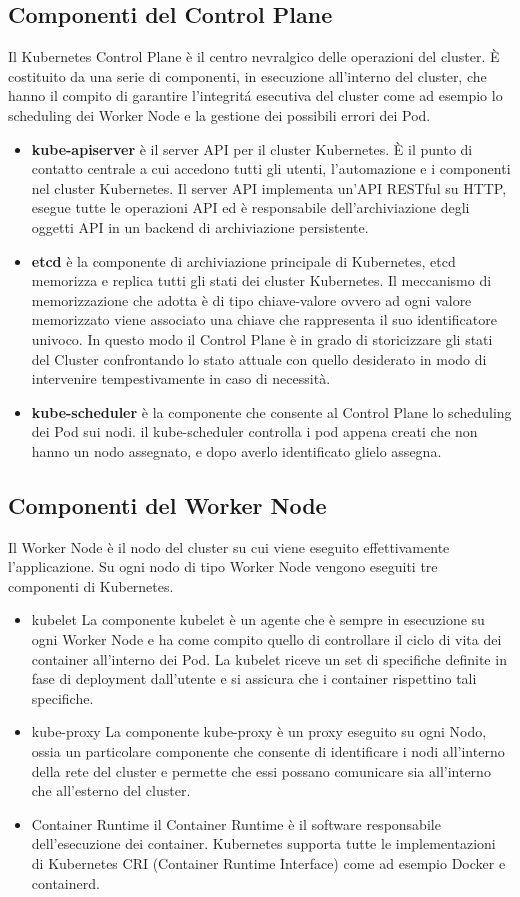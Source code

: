 \subsection{Componenti del Control Plane}
Il Kubernetes Control Plane è il centro nevralgico delle operazioni del cluster. È costituito da una serie di componenti, in esecuzione all'interno del cluster, che hanno il compito di garantire l'integritá esecutiva del cluster come ad esempio lo scheduling dei Worker Node e la gestione dei possibili errori dei Pod.
\begin{itemize}
    \item\textbf{kube-apiserver}
    è il server API per il cluster Kubernetes. È il punto di contatto centrale a cui accedono tutti gli utenti, l'automazione e i componenti nel cluster Kubernetes. Il server API implementa un'API RESTful su HTTP, esegue tutte le operazioni API ed è responsabile dell'archiviazione degli oggetti API in un backend di archiviazione persistente.
    \item\textbf{etcd}
    è la componente di archiviazione principale di Kubernetes, etcd memorizza e replica tutti gli stati dei cluster Kubernetes. Il meccanismo di memorizzazione che adotta è di tipo chiave-valore ovvero ad ogni valore memorizzato viene associato una chiave che rappresenta il suo identificatore univoco. In questo modo il Control Plane è in grado di storicizzare gli stati del Cluster confrontando lo stato attuale con quello desiderato in modo di intervenire tempestivamente in caso di necessità.
    \item\textbf{kube-scheduler}
    è la componente che consente al Control Plane lo scheduling dei Pod sui nodi. il kube-scheduler controlla i pod appena creati che non hanno un nodo assegnato, e dopo averlo identificato glielo assegna. 
\end{itemize}
\subsection{Componenti del Worker Node}
Il Worker Node è il nodo del cluster su cui viene eseguito effettivamente l'applicazione. Su ogni nodo di tipo Worker Node vengono eseguiti tre componenti di Kubernetes.
\begin{itemize}
    \item{kubelet}
    La componente kubelet è un agente che è sempre in esecuzione su ogni Worker Node e ha come compito quello di controllare il ciclo di vita dei container all'interno dei Pod. La kubelet riceve un set di specifiche definite in fase di deployment dall'utente e si assicura che i container rispettino tali specifiche.
    \item{kube-proxy}
    La componente kube-proxy è un proxy eseguito su ogni Nodo, ossia un particolare componente che consente di identificare i nodi all'interno della rete del cluster e permette che essi possano comunicare sia all'interno che all'esterno del cluster.
    \item{Container Runtime} il Container Runtime è il software responsabile dell'esecuzione dei container. Kubernetes supporta tutte le implementazioni di Kubernetes CRI (Container Runtime Interface) come ad esempio Docker e containerd.
\end{itemize}
